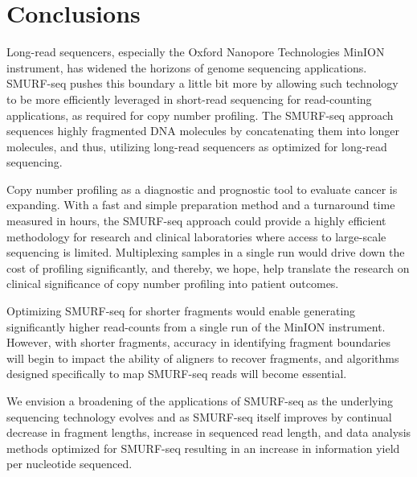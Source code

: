 \chapter{Conclusions}
\label{ch5}

Long-read sequencers, especially the Oxford Nanopore Technologies MinION
instrument, has widened the horizons of genome sequencing applications.
SMURF-seq pushes this boundary a little bit more by allowing such
technology to be more efficiently leveraged in short-read sequencing for
read-counting applications, as required for copy number profiling.
%
The SMURF-seq approach sequences highly fragmented DNA molecules by
concatenating them into longer molecules, and thus, utilizing long-read
sequencers as optimized for long-read sequencing.

Copy number profiling as a diagnostic and prognostic tool to evaluate
cancer is expanding. With a fast and simple preparation method and a
turnaround time measured in hours, the SMURF-seq approach could provide
a highly efficient methodology for research and clinical laboratories
where access to large-scale sequencing is limited. Multiplexing samples
in a single run would drive down the cost of profiling significantly, and
thereby, we hope, help translate the research on clinical significance of
copy number profiling into patient outcomes.

Optimizing SMURF-seq for shorter fragments would enable generating
significantly higher read-counts from a single run of the MinION
instrument.  However, with shorter fragments, accuracy in identifying
fragment boundaries will begin to impact the ability of aligners to
recover fragments, and algorithms designed specifically to map SMURF-seq
reads will become essential.

We envision a broadening of the applications of SMURF-seq as the
underlying sequencing technology evolves and as SMURF-seq itself
improves by continual decrease in fragment lengths, increase in
sequenced read length, and data analysis methods optimized for SMURF-seq
resulting in an increase in information yield per nucleotide sequenced.

